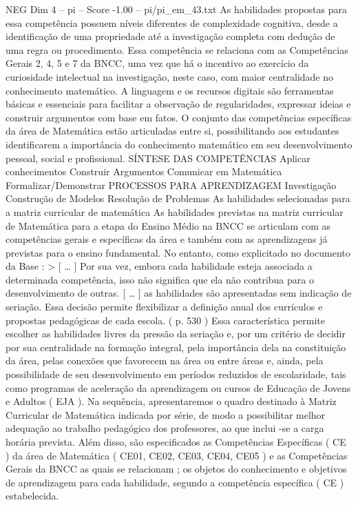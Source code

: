 \begin{textsample}{NEG Dim 4 – pi – Score -1.00 – pi/pi\_em\_43.txt}
As habilidades propostas para essa competência possuem níveis diferentes de complexidade cognitiva, desde a identificação de uma propriedade até a investigação completa com dedução de uma regra ou procedimento.
Essa competência se relaciona com as Competências Gerais 2, 4, 5 e 7 da BNCC, uma vez que há o incentivo ao exercício da curiosidade intelectual na investigação, neste caso, com maior centralidade no conhecimento matemático.
A linguagem e os recursos digitais são ferramentas básicas e essenciais para facilitar a observação de regularidades, expressar ideias e construir argumentos com base em fatos.
O conjunto das competências específicas da área de Matemática estão articuladas entre si, possibilitando aos estudantes identificarem a importância do conhecimento matemático em seu desenvolvimento pessoal, social e profissional.
SÍNTESE DAS COMPETÊNCIAS Aplicar conhecimentos Construir Argumentos Comunicar em Matemática Formalizar/Demonstrar PROCESSOS PARA APRENDIZAGEM Investigação Construção de Modelos Resolução de Problemas As habilidades selecionadas para a matriz curricular de matemática As habilidades previstas na matriz curricular de Matemática para a etapa do Ensino Médio na BNCC se articulam com as competências gerais e específicas da área e também com as aprendizagens já previstas para o ensino fundamental.
No entanto, como explicitado no documento da Base : > [ … ] Por sua vez, embora cada habilidade esteja associada a determinada competência, isso não significa que ela não contribua para o desenvolvimento de outras. [ … ] as habilidades são apresentadas sem indicação de seriação.
Essa decisão permite flexibilizar a definição anual dos currículos e propostas pedagógicas de cada escola. ( p. 530 ) Essa característica permite escolher as habilidades livres da pressão da seriação e, por um critério de decidir por sua centralidade na formação integral, pela importância dela na constituição da área, pelas conexões que favorecem na área ou entre áreas e, ainda, pela possibilidade de seu desenvolvimento em períodos reduzidos de escolaridade, tais como programas de aceleração da aprendizagem ou cursos de Educação de Jovens e Adultos ( EJA ).
Na sequência, apresentaremos o quadro destinado à Matriz Curricular de Matemática indicada por série, de modo a possibilitar melhor adequação ao trabalho pedagógico dos professores, ao que inclui -se a carga horária prevista.
Além disso, são especificados as Competências Específicas ( CE ) da área de Matemática ( CE01, CE02, CE03, CE04, CE05 ) e as Competências Gerais da BNCC as quais se relacionam ; os objetos do conhecimento e objetivos de aprendizagem para cada habilidade, segundo a competência específica ( CE ) estabelecida.

\end{textsample}
